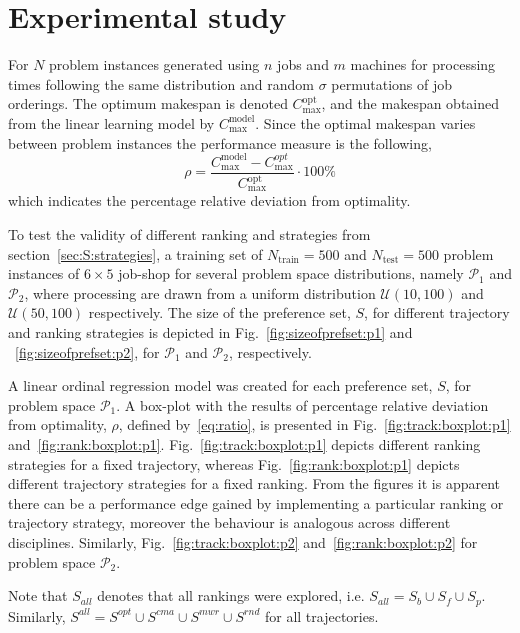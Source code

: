 \documentclass[smallextended]{llncs}
\begin{document}
\section{Experimental study}\label{sec:expr:locallin}

For $N$ problem instances generated using $n$ jobs and $m$ machines for processing times 
following the same distribution and random $\sigma$ permutations of job orderings. The optimum makespan is denoted 
$C_{\max}^{\text{opt}}$, and the makespan obtained from the linear learning model by $C_{\max}^{\text{model}}$. Since 
the optimal makespan varies between problem instances the performance measure is the following, 
\begin{equation}\label{eq:ratio}\rho=\frac{C_{\max}^{\text{model}}-C_{\max}^{opt}}{C_{\max}^{\text{opt}}}\cdot 
100\%\end{equation}
which indicates the percentage relative deviation from optimality. 


To test the validity of different ranking and strategies from section~\ref{sec:S:strategies}, a training set of 
$N_{\text{train}}=500$ and $N_{\text{test}}=500$ problem instances of $6\times 5$ job-shop for several problem space 
distributions, namely $\mathcal{P}_1$ and $\mathcal{P}_2$, where processing are drawn from a uniform distribution 
$\mathcal{U}(10,100)$ and $\mathcal{U}(50,100)$ respectively. 
The size of the preference set, $S$, for different trajectory and ranking strategies is depicted in Fig.~\ref{fig:sizeofprefset:p1} and ~\ref{fig:sizeofprefset:p2}, for $\mathcal{P}_1$ and $\mathcal{P}_2$, respectively. 

A linear ordinal regression model was created for each preference set, $S$, for problem space $\mathcal{P}_1$. A box-plot with the results of percentage relative deviation from optimality, $\rho$, defined by~\eqref{eq:ratio}, is presented in Fig.~\ref{fig:track:boxplot:p1} and~\ref{fig:rank:boxplot:p1}. Fig.~\ref{fig:track:boxplot:p1} depicts different ranking strategies for a fixed trajectory, whereas Fig.~\ref{fig:rank:boxplot:p1} depicts different trajectory strategies for a fixed ranking. 
From the figures it is apparent there can be a performance edge gained by implementing a particular ranking or trajectory strategy, moreover the behaviour is analogous across different disciplines. Similarly, Fig.~\ref{fig:track:boxplot:p2} and~\ref{fig:rank:boxplot:p2} for problem space $\mathcal{P}_2$.

Note that $S_{all}$ denotes that all rankings were explored, i.e. $S_{all}=S_b\cup S_f\cup S_p$. Similarly, $S^{all}=S^{opt}\cup S^{cma}\cup S^{mwr} \cup S^{rnd}$ for all trajectories.
\end{document}
